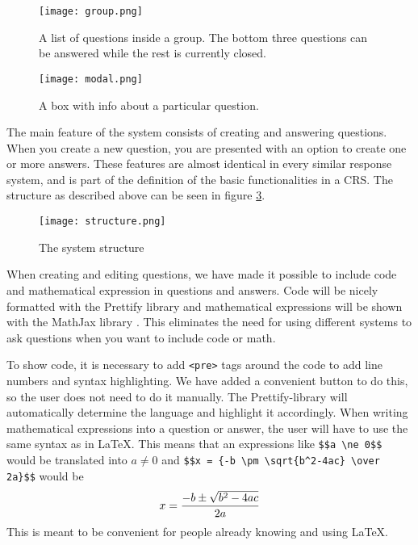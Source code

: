 \begin{figure}[H]
\capstart
	\centering
		\texttt{[image: group.png]}
	\caption[Inside a group]{A list of questions inside a group. The bottom three questions can be answered while the rest is currently closed.}\label{fig:group}
\end{figure}

\begin{figure}[H]
\capstart
	\centering
		\texttt{[image: modal.png]}
	\caption[Info box]{A box with info about a particular question.}\label{fig:modal}
\end{figure}

The main feature of the system consists of creating and answering questions. When you create a new question, you are presented with an option to create one or more answers.
These features are almost identical in every similar response system, and is part of the definition of the basic functionalities in a CRS. The structure as described above can be seen in figure \ref{fig:structure}.

\begin{figure}[H]
\capstart
	\centering
		\texttt{[image: structure.png]}
	\caption[System Structure]{The system structure}\label{fig:structure}
\end{figure}

When creating and editing questions, we have made it possible to include code and mathematical expression in questions and answers. Code will be nicely formatted with the Prettify library \cite{google/code-prettify_2016} and mathematical expressions will be shown with the MathJax library \cite{mathjax_2016}. This eliminates the need for using different systems to ask questions when you want to include code or math. 

To show code, it is necessary to add \texttt{<pre>} tags around the code to add line numbers and syntax highlighting. We have added a convenient button to do this, so the user does not need to do it manually. The Prettify-library will automatically determine the language and highlight it accordingly. When writing mathematical expressions into a question or answer, the user will have to use the same syntax as in \LaTeX. This means that an expressions like \verb|$$a \ne 0$$| would be translated into $a \ne 0$ and \verb|$$x = {-b \pm \sqrt{b^2-4ac} \over 2a}$$| would be 
$$x = {-b \pm \sqrt{b^2-4ac} \over 2a}$$
This is meant to be convenient for people already knowing and using \LaTeX.

